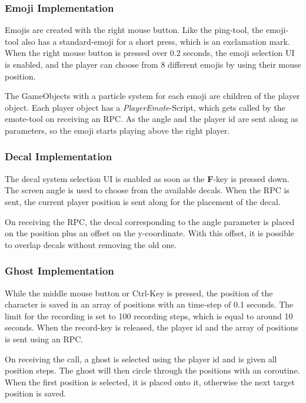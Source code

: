 \subsubsection{Emoji Implementation}

Emojis are created with the right mouse button. Like the ping-tool, the emoji-tool also has a standard-emoji for a short press, which is an exclamation mark.
When the right mouse button is pressed over 0.2 seconds, the emoji selection UI is enabled, and the player can choose from 8 different emojis by using their mouse position.

The GameObjects with a particle system for each emoji are children of the player object.
Each player object has a \textit{PlayerEmote}-Script, which gets called by the emote-tool on receiving an RPC. As the angle and the player id are sent along as parameters, so the emoji starts playing above the right player.

\subsubsection{Decal Implementation}

The decal system selection UI is enabled as soon as the \textbf{F}-key is pressed down. The screen angle is used to choose from the available decals. When the RPC is sent, the current player position is sent along for the placement of the decal.

On receiving the RPC, the decal corresponding to the angle parameter is placed on the position plus an offset on the y-coordinate. With this offset, it is possible to overlap decals without removing the old one.

\subsubsection{Ghost Implementation}

While the middle mouse button or Ctrl-Key is pressed, the position of the character is saved in an array of positions with an time-step of 0.1 seconds. The limit for the recording is set to 100 recording steps, which is equal to around 10 seconds.
When the record-key is released, the player id and the array of positions is sent using an RPC.

On receiving the call, a ghost is selected using the player id and is given all position steps. The ghost will then circle through the positions with an coroutine. When the first position is selected, it is placed onto it, otherwise the next target position is saved. 

